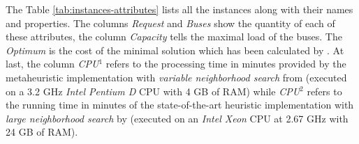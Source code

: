 \documentclass[tuberlin,cic,tc,openright,english,noabntcite,oneside]{iiufrgs}
\begin{document}
The Table \ref{tab:instances-attributes} lists all the instances along with their names and properties. The columns \emph{Request} and \emph{Buses} show the quantity of each of these attributes, the column \emph{Capacity} tells the maximal load of the buses. The \emph{Optimum} is the cost of the minimal solution which has been calculated by \textcite[p. 270]{ropke_models_2007}. At last, the column \emph{CPU$^1$} refers to the processing time in minutes provided by the metaheuristic implementation with \emph{variable neighborhood search} from \textcite{parragh_introducing_2011} (executed on a 3.2 GHz \emph{Intel Pentium D} CPU with 4 GB of RAM) while \emph{CPU$^2$} refers to the running time in minutes of the state-of-the-art heuristic implementation with \emph{large neighborhood search} by \textcite{parragh_hybrid_2013} (executed on an \emph{Intel Xeon} CPU at 2.67 GHz with 24 GB of RAM).
\end{document}
